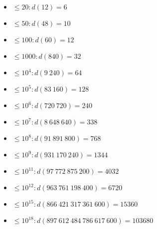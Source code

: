 \begin{itemize}
\item $\leq 20: d(12) = 6$
\item $\leq 50: d(48) = 10$
\item $\leq 100: d(60) = 12$
\item $\leq 1000: d(840) = 32$
\item $\leq 10^4: d(9\ 240) = 64$
\item $\leq 10^5: d(83\ 160) = 128$
\item $\leq 10^6: d(720\ 720) = 240$
\item $\leq 10^7: d(8\ 648\ 640) = 338$
\item $\leq 10^8: d(91\ 891\ 800) = 768$
\item $\leq 10^9: d(931\ 170\ 240) = 1344$
\item $\leq 10^{11}: d(97\ 772\ 875\ 200) = 4032$
\item $\leq 10^{12}: d(963\ 761\ 198\ 400) = 6720$
\item $\leq 10^{15}: d(866\ 421\ 317\ 361\ 600) = 15360$
\item $\leq 10^{18}: d(897\ 612\ 484\ 786\ 617\ 600) = 103680$
\end{itemize}

